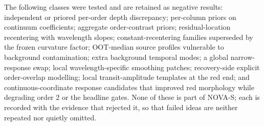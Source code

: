 The following classes were tested and are retained as negative results:
independent or priored per-order depth discrepancy; per-column priors on
continuum coefficients; aggregate order-contrast priors; residual-location
recentering with wavelength slopes; constant-recentering families superseded
by the frozen curvature factor; OOT-median source profiles vulnerable to
background contamination; extra background temporal modes; a global
narrow-response swap; local wavelength-specific smoothing patches;
recovery-side explicit order-overlap modelling; local transit-amplitude
templates at the red end; and continuous-coordinate response candidates that
improved red morphology while degrading order 2 or the headline gates. None
of these is part of NOVA-S; each is recorded with the evidence that rejected
it, so that failed ideas are neither repeated nor quietly omitted.
